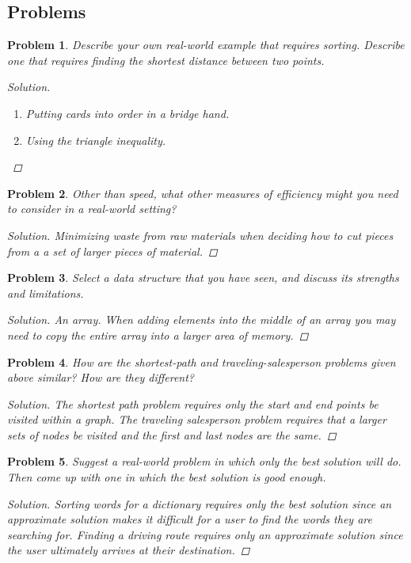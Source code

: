 \documentclass[oneside]{book}
\newtheorem{problem}{Problem}[section]
\begin{document}
\begin{spacing}{1.618}
\subsection{Problems}

\begin{problem}
Describe your own real-world example that requires sorting. Describe one that requires finding the shortest distance between two points.
\begin{proof}[Solution] \ \par
	\begin{enumerate}
		\item Putting cards into order in a bridge hand. 
		\item Using the triangle inequality. 
	\end{enumerate}
\end{proof}
\end{problem}

\begin{problem}
	Other than speed, what other measures of efficiency might you need to consider in a real-world setting?
	\begin{proof}[Solution]
		Minimizing waste from raw materials when deciding how to cut pieces from a a set of larger pieces of material. 
	\end{proof}
\end{problem}

\begin{problem}
	Select a data structure that you have seen, and discuss its strengths and limitations.
	\begin{proof}[Solution]
		An array. When adding elements into the middle of an array you may need to copy the entire array into a larger area of memory. 
	\end{proof}
\end{problem}

\begin{problem}
	How are the shortest-path and traveling-salesperson problems given above similar?
	How are they different?
	\begin{proof}[Solution]
		The shortest path problem requires only the start and end points be visited within a graph. The traveling salesperson problem requires that a larger sets of nodes be visited and the first and last nodes are the same. 
	\end{proof}
\end{problem}

\begin{problem}
		Suggest a real-world problem in which only the best solution will do. Then come up with one in which the best solution is good enough.
	\begin{proof}[Solution]
		Sorting words for a dictionary requires only the best solution since an approximate solution makes it difficult for a user to find the words they are searching for. Finding a driving route requires only an approximate solution since the user ultimately arrives at their destination. 
	\end{proof}
\end{problem}


\end{spacing}
\end{document}
